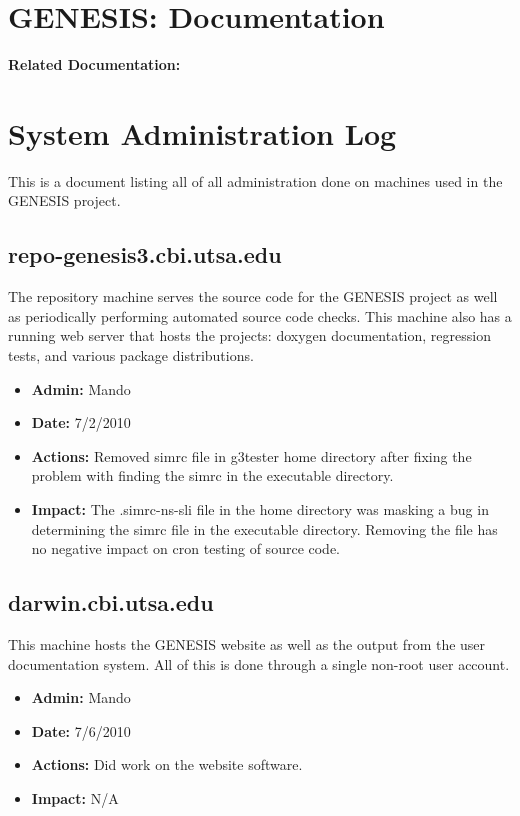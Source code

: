 \documentclass[12pt]{article}
\begin{document}
\section*{GENESIS: Documentation}

{\bf Related Documentation:}

\section*{System Administration Log}

This is a document listing all of all administration done on machines used in the GENESIS project.

\subsection*{repo-genesis3.cbi.utsa.edu}

The repository machine serves the source code for the GENESIS project as well as periodically performing automated source code checks. This machine also has a running web server that hosts the projects: doxygen documentation, regression tests, and various package distributions.

\begin{itemize}
\item[] {\bf Admin:} Mando
\item[] {\bf Date:} 7/2/2010 
\item[] {\bf Actions:} Removed simrc file in g3tester home directory after fixing the problem with finding the simrc in the executable directory.
\item[] {\bf Impact:} The .simrc-ns-sli file in the home directory was masking a bug in determining the simrc file in the executable directory. Removing the file has no negative impact on cron testing of source code. 
\end{itemize}


\subsection*{darwin.cbi.utsa.edu}

This machine hosts the GENESIS website as well as the output from the user documentation system. All of this is done through a single non-root user account.

\begin{itemize}
\item[] {\bf Admin:} Mando
\item[] {\bf Date:} 7/6/2010
\item[] {\bf Actions:} Did work on the website software. 
\item[] {\bf Impact:} N/A
\end{itemize}
\end{document}
